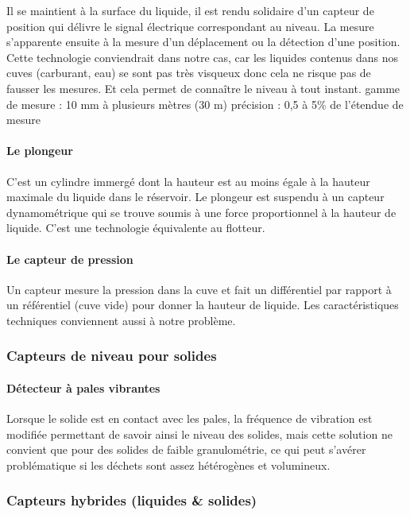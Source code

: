 Il se maintient à la surface du liquide, il est rendu solidaire d'un capteur de position qui délivre le signal électrique correspondant au niveau. La mesure s'apparente ensuite à la mesure d'un déplacement ou la détection d'une position.
Cette technologie conviendrait dans notre cas, car les liquides contenus dans nos cuves (carburant, eau) se sont pas très visqueux donc cela ne risque pas de fausser les mesures. Et cela permet de connaître le niveau à tout instant.
gamme de mesure : 10 mm à plusieurs mètres (30 m)
précision : 0,5 à 5\% de l'étendue de mesure

\paragraph{Le plongeur}

C'est un cylindre immergé dont la hauteur est au moins égale à la hauteur maximale du liquide dans le réservoir. Le plongeur est suspendu à un capteur dynamométrique qui se trouve soumis à une force proportionnel à la hauteur de liquide. C’est une technologie équivalente au flotteur.

\paragraph{Le capteur de pression}

Un capteur mesure la pression dans la cuve et fait un différentiel par rapport à un référentiel (cuve vide) pour donner la hauteur de liquide. Les caractéristiques techniques conviennent aussi à notre problème.

\subsubsection{Capteurs de niveau pour solides}

\paragraph{Détecteur à pales vibrantes}

Lorsque le solide est en contact avec les pales, la fréquence de vibration est modifiée permettant de savoir ainsi le niveau des solides, mais cette solution ne convient que pour des solides de faible granulométrie, ce qui peut s’avérer problématique si les déchets sont assez hétérogènes et volumineux.

\subsubsection{Capteurs hybrides (liquides \&  solides)}


